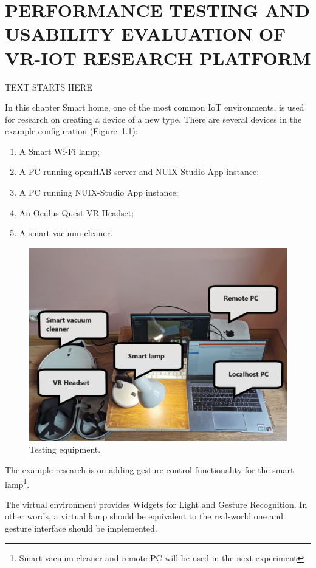 
\chapter{PERFORMANCE TESTING AND USABILITY EVALUATION OF VR-IOT RESEARCH PLATFORM}

TEXT STARTS HERE

In this chapter Smart home, one of the most common IoT environments, is used for research on creating a device of a new type. There are several devices in the example configuration (Figure~\ref{fig:TestingEquipment-figure}): 
\begin{enumerate}
    \item A Smart Wi-Fi lamp;
    \item A PC running openHAB server and NUIX-Studio App instance;
    \item A PC running NUIX-Studio App instance;
    \item An Oculus Quest VR Headset;
    \item A smart vacuum cleaner.
\end{enumerate}

\begin{figure}
  \centering
  \includegraphics[width=0.9\linewidth]{figures/TestingEquipment.png}
  \caption{Testing equipment.}
  \label{fig:TestingEquipment-figure}
\end{figure}

The example research is on adding gesture control functionality for the smart lamp\footnote{Smart vacuum cleaner and remote PC will be used in the next experiment}.

The virtual environment provides Widgets for Light and Gesture Recognition. In other words, a virtual lamp should be equivalent to the real-world one and gesture interface should be implemented.

